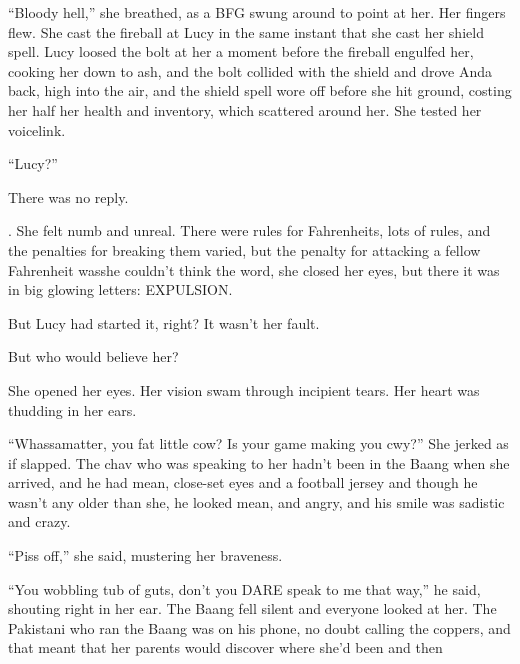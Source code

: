 “Bloody hell,” she breathed, as a BFG swung around to point at her.
Her fingers flew. She cast the fireball at Lucy in the same instant
that she cast her shield spell. Lucy loosed the bolt at her a
moment before the fireball engulfed her, cooking her down to ash,
and the bolt collided with the shield and drove Anda back, high
into the air, and the shield spell wore off before she hit ground,
costing her half her health and inventory, which scattered around
her. She tested her voicelink.

“Lucy?”

There was no reply.

.
She felt numb and unreal. There were rules for Fahrenheits, lots of
rules, and the penalties for breaking them varied, but the penalty
for attacking a fellow Fahrenheit was\dash{}she couldn’t think the word,
she closed her eyes, but there it was in big glowing letters:
EXPULSION.

But Lucy had started it, right? It wasn’t her fault.

But who would believe her?

She opened her eyes. Her vision swam through incipient tears. Her
heart was thudding in her ears.

“Whassamatter, you fat little cow? Is your game making you cwy?”
She jerked as if slapped. The chav who was speaking to her hadn’t
been in the Baang when she arrived, and he had mean, close-set eyes
and a football jersey and though he wasn’t any older than she, he
looked mean, and angry, and his smile was sadistic and crazy.

“Piss off,” she said, mustering her braveness.

“You wobbling tub of guts, don’t you DARE speak to me that way,” he
said, shouting right in her ear. The Baang fell silent and everyone
looked at her. The Pakistani who ran the Baang was on his phone, no
doubt calling the coppers, and that meant that her parents would
discover where she’d been and then\dash{}

